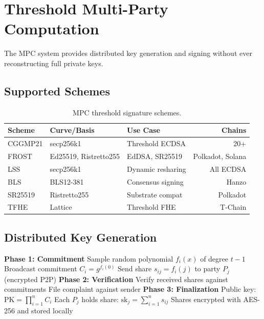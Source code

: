 \documentclass[11pt,letterpaper]{article}
\begin{document}
\section{Threshold Multi-Party Computation}

The MPC system provides distributed key generation and signing without ever reconstructing full private keys.

\subsection{Supported Schemes}

\begin{table}[H]
\centering
\begin{tabular}{@{}lllr@{}}
\toprule
\textbf{Scheme} & \textbf{Curve/Basis} & \textbf{Use Case} & \textbf{Chains} \\
\midrule
CGGMP21 & secp256k1 & Threshold ECDSA & 20+ \\
FROST & Ed25519, Ristretto255 & EdDSA, SR25519 & Polkadot, Solana \\
LSS & secp256k1 & Dynamic resharing & All ECDSA \\
BLS & BLS12-381 & Consensus signing & Hanzo \\
SR25519 & Ristretto255 & Substrate compat & Polkadot \\
TFHE & Lattice & Threshold FHE & T-Chain \\
\bottomrule
\end{tabular}
\caption{MPC threshold signature schemes.}
\label{tab:mpc-schemes}
\end{table}

\subsection{Distributed Key Generation}

\begin{algorithm}[H]
\caption{Verifiable Secret Sharing DKG}
\begin{algorithmic}[1]
\State \textbf{Phase 1: Commitment}
  \State Sample random polynomial $f_i(x)$ of degree $t-1$
  \State Broadcast commitment $C_i = g^{f_i(0)}$
  \State Send share $s_{ij} = f_i(j)$ to party $P_j$ (encrypted P2P)
\EndFor
\Statex
\State \textbf{Phase 2: Verification}
  \State Verify received shares against commitments
    \State File complaint against sender
  \EndIf
\EndFor
\Statex
\State \textbf{Phase 3: Finalization}
\State Public key: $\text{PK} = \prod_{i=1}^{n} C_i$
\State Each $P_j$ holds share: $\text{sk}_j = \sum_{i=1}^{n} s_{ij}$
\State Shares encrypted with AES-256 and stored locally
\end{algorithmic}
\end{algorithm}
\end{document}
